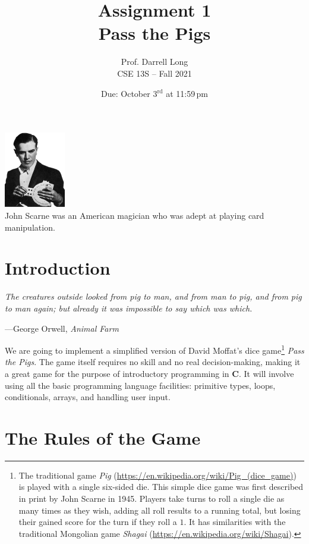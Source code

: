 \documentclass{article}
\title{Assignment 1 \\ Pass the Pigs}
\author{Prof. Darrell Long \\
CSE 13S -- Fall 2021}
\date{Due: October 3$^\text{rd}$ at 11:59\,pm}
\begin{document}
\maketitle

\begin{center}
\includegraphics[width=0.2\textwidth]{./images/scarne.png} \\
John Scarne was an American magician who was adept at playing card manipulation.
\end{center}

\section{Introduction}

\textwidth \epigraph{\emph{The creatures outside
looked from pig to man, and from man to pig, and from pig to man again;
but already it was impossible to say which was which.}}{---George
Orwell, \emph{Animal Farm}}

\noindent We are going to implement a simplified version of David
Moffat's dice game\footnote{The traditional game\xspace
\emph{Pig} (\url{https://en.wikipedia.org/wiki/Pig_(dice_game)})
is played with a single six-sided die.
This simple dice game was first described in print by John Scarne in 1945.
Players take turns to roll a single die as many times as they wish,
adding all roll results to a running total, but losing their gained score for
the turn if they roll a $1$.
It has similarities with the traditional Mongolian game \emph{Shagai}\xspace
(\url{https://en.wikipedia.org/wiki/Shagai}).}
\emph{Pass the Pigs}. The game itself requires no
skill and no real decision-making, making it a great game for the
purpose of introductory programming in \textbf{C}. It will involve using
all the basic programming language facilities: primitive types, loops,
conditionals, arrays, and handling user input.

\section{The Rules of the Game}\label{rules}
\end{document}

